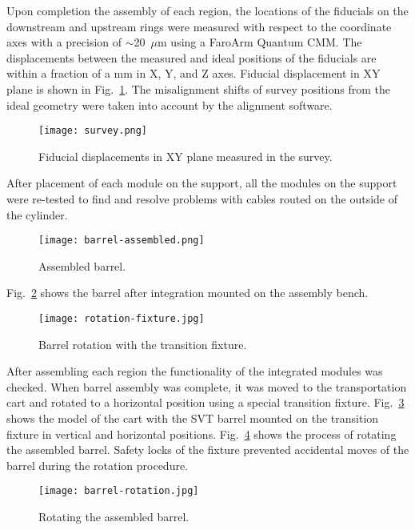 Upon completion the assembly of each region, the locations of the fiducials on the downstream and upstream rings were measured with respect to the coordinate axes with a precision of $\sim$20~$\mu$m using a FaroArm Quantum CMM. The displacements between the measured and ideal positions of the fiducials are within a fraction of a mm in X, Y, and Z axes. Fiducial displacement in XY plane is shown in Fig.~\ref{fig:survey}. The misalignment shifts of survey positions from the ideal geometry were taken into account by the alignment software. 

\begin{figure}[hbt]
\centering 
\texttt{[image: survey.png]}
\caption{Fiducial displacements in XY plane measured in the survey.}
\label{fig:survey}
\end{figure}

After placement of each module on the support, all the modules on the support were re-tested to find and resolve problems with cables routed on the outside of the cylinder. 

\begin{figure}[hbt] 
\centering 
\texttt{[image: barrel-assembled.png]}
\caption{Assembled barrel.}
\label{fig:barrel-assembled}
\end{figure}

Fig.~\ref{fig:barrel-assembled} shows the barrel after integration mounted on the assembly bench.

\begin{figure}[hbt] 
\centering 
\texttt{[image: rotation-fixture.jpg]}
\caption{Barrel rotation with the transition fixture.}
\label{fig:rotation-fixture}
\end{figure}

After assembling each region the functionality of the integrated modules was checked. When barrel assembly was complete, it was moved to the transportation cart and rotated to a horizontal position using a special transition fixture. Fig.~\ref{fig:rotation-fixture} shows the model of the cart with the SVT barrel mounted on the transition fixture in vertical and horizontal positions. Fig.~\ref{fig:barrel-rotation} shows the process of rotating the assembled barrel. Safety locks of the fixture prevented accidental moves of the barrel during the rotation procedure.

\begin{figure}[hbt] 
\centering 
\texttt{[image: barrel-rotation.jpg]}
\caption{Rotating the assembled barrel.}
\label{fig:barrel-rotation}
\end{figure}

